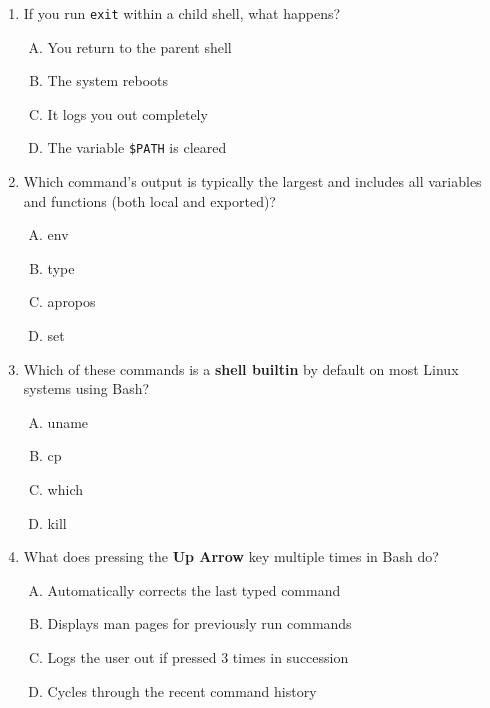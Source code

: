 \documentclass[a4paper]{report}
\begin{document}
\begin{enumerate}[1.]
    \item If you run \texttt{exit} within a child shell, what happens?  
    \begin{enumerate}[A)]
        \item You return to the parent shell  
        \item The system reboots  
        \item It logs you out completely  
        \item The variable \texttt{\$PATH} is cleared  
    \end{enumerate}

    \item Which command’s output is typically the largest and includes all variables and functions (both local and exported)?  
    \begin{enumerate}[A)]
        \item env  
        \item type  
        \item apropos  
        \item set  
    \end{enumerate}

    \item Which of these commands is a \textbf{shell builtin} by default on most Linux systems using Bash?  
    \begin{enumerate}[A)]
        \item uname  
        \item cp  
        \item which  
        \item kill  
    \end{enumerate}

    \item What does pressing the \textbf{Up Arrow} key multiple times in Bash do?  
    \begin{enumerate}[A)]
        \item Automatically corrects the last typed command  
        \item Displays man pages for previously run commands  
        \item Logs the user out if pressed 3 times in succession  
        \item Cycles through the recent command history  
    \end{enumerate}

\end{enumerate}


\newpage
\end{document}
